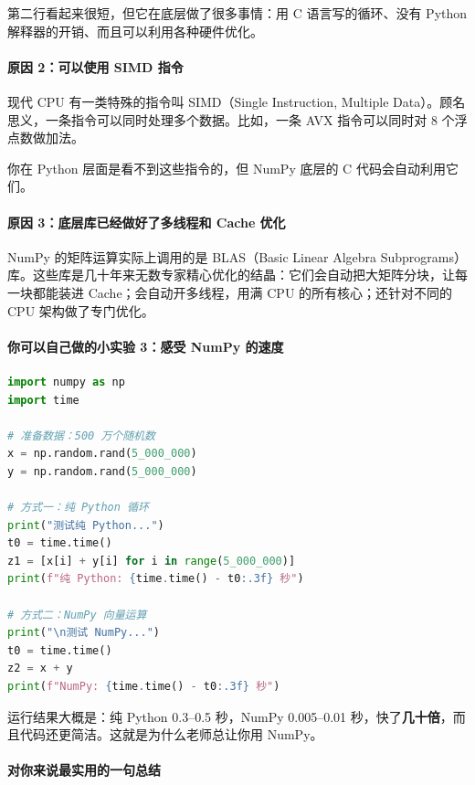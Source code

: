 第二行看起来很短，但它在底层做了很多事情：用 C 语言写的循环、没有 Python 解释器的开销、而且可以利用各种硬件优化。

\paragraph{原因 2：可以使用 SIMD 指令}

现代 CPU 有一类特殊的指令叫 SIMD（Single Instruction, Multiple Data）。顾名思义，一条指令可以同时处理多个数据。比如，一条 AVX 指令可以同时对 8 个浮点数做加法。

你在 Python 层面是看不到这些指令的，但 NumPy 底层的 C 代码会自动利用它们。

\paragraph{原因 3：底层库已经做好了多线程和 Cache 优化}

NumPy 的矩阵运算实际上调用的是 BLAS（Basic Linear Algebra Subprograms）库。这些库是几十年来无数专家精心优化的结晶：它们会自动把大矩阵分块，让每一块都能装进 Cache；会自动开多线程，用满 CPU 的所有核心；还针对不同的 CPU 架构做了专门优化。

\paragraph{你可以自己做的小实验 3：感受 NumPy 的速度}

\begin{lstlisting}[style=teaching, language=Python]
import numpy as np
import time

# 准备数据：500 万个随机数
x = np.random.rand(5_000_000)
y = np.random.rand(5_000_000)

# 方式一：纯 Python 循环
print("测试纯 Python...")
t0 = time.time()
z1 = [x[i] + y[i] for i in range(5_000_000)]
print(f"纯 Python: {time.time() - t0:.3f} 秒")

# 方式二：NumPy 向量运算
print("\n测试 NumPy...")
t0 = time.time()
z2 = x + y
print(f"NumPy: {time.time() - t0:.3f} 秒")
\end{lstlisting}

运行结果大概是：纯 Python 0.3--0.5 秒，NumPy 0.005--0.01 秒，快了\textbf{几十倍}，而且代码还更简洁。这就是为什么老师总让你用 NumPy。

\paragraph{对你来说最实用的一句总结}

